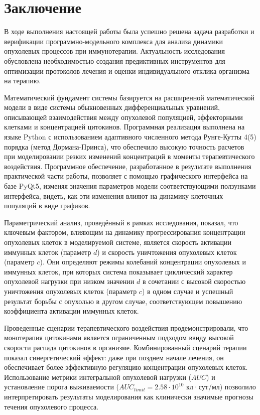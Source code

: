\chapter*{Заключение}

В ходе выполнения настоящей работы была успешно решена
задача разработки и верификации программно-модельного комплекса для анализа
динамики опухолевых процессов при иммунотерапии. Актуальность исследования
обусловлена необходимостью создания предиктивных инструментов для оптимизации
протоколов лечения и оценки индивидуального отклика организма на терапию.

Математический фундамент системы базируется на расширенной математической модели в виде
системы обыкновенных дифференциальных уравнений, описывающей взаимодействия
между опухолевой популяцией, эффекторными клетками и концентрацией цитокинов.
Программная реализация выполнена на языке Python с использованием адаптивного
численного метода Рунге-Кутты 4(5) порядка (метод Дормана-Принса), что
обеспечило высокую точность расчетов при моделировании резких изменений
концентраций в моменты терапевтического воздействия. Программное обеспечение,
разработанное в результате выполнения практической части работы, позволяет с
помощью графического интерфейса на базе PyQt5, изменяя значения параметров
модели соответствующими ползунками интерфейса, видеть, как эти изменения влияют
на динамику клеточных популяций в виде графиков.

Параметрический анализ, проведённый в рамках исследования, показал, что
ключевым фактором, влияющим на динамику прогрессирования концентрации
опухолевых клеток в моделируемой системе, является скорость активации иммунных
клеток (параметр $d$) и скорость уничтожения опухолевых клеток (параметр $c$).
Они определяют режимы колебаний концентрации опухолевых и иммунных клеток,
при которых система показывает циклический характер опухолевой нагрузки при
низком значении $d$ в сочетании с высокой скоростью уничтожения опухолевых
клеток (параметр $c$) в одном случае и успешный результат борьбы с опухолью в
другом случае, соответствующем повышению коэффициента активации иммунных клеток.

Проведенные сценарии терапевтического воздействия продемонстрировали, что
монотерапия цитокинами является ограниченным подходом ввиду высокой скорости
распада цитокинов в организме. Комбинированный сценарий терапии показал
синергетический эффект: даже при позднем начале лечения, он обеспечивает более
эффективную регуляцию концентрации опухолевых клеток. Использование метрики
интегральной опухолевой нагрузки ($AUC$) и установление порога выживаемости
($AUC_{limit} = 2.58 \cdot 10^{10}$ кл·сут/мл) позволило интерпретировать
результаты моделирования как клинически значимые прогнозы течения опухолевого процесса.

